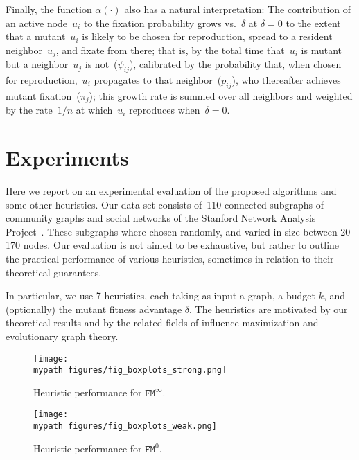 \documentclass[letterpaper]{article}
\def\mypath{}
\newcommand{\NodeActivationMoranStrong}{\texttt{FM}^{\infty}}
\newcommand{\NodeActivationMoranWeak}{\texttt{FM}^{0}}
\newcommand{\FitAdv}{\delta}
\begin{document}
Finally, the function $\alpha(\cdot)$ also has a natural interpretation:
The contribution of an active node~$u_i$ to the fixation probability grows vs.~$\FitAdv$ at $\FitAdv = 0$
to the extent that a mutant~$u_i$ is likely to be chosen for reproduction,
spread to a resident neighbor~$u_j$, and fixate from there;
that is, by the total time that~$u_i$ is mutant but a neighbor~$u_j$ is not~($\psi_{ij}$),
calibrated by the probability that, when chosen for reproduction,~$u_i$ propagates to that neighbor~($p_{ij}$),
who thereafter achieves mutant fixation~($\pi_j$);
this growth rate is summed over all neighbors and weighted by the rate~$1/n$ at which~$u_i$ reproduces when~$\FitAdv=0$.


%
\section{Experiments}\label{sec:experiments}

Here we report on an experimental evaluation of the proposed algorithms and some other heuristics.
Our data set consists of~110 connected subgraphs of community graphs and social networks of the Stanford Network Analysis Project~\cite{Leskovec2014}.
These subgraphs where chosen randomly, and varied in size between 20-170 nodes.
Our evaluation is not aimed to be exhaustive, but rather to outline the practical performance of various heuristics, sometimes in relation to their theoretical guarantees.

In particular, we use 7 heuristics, each taking as input a graph, a budget $k$, and (optionally) the mutant fitness advantage $\FitAdv$.
The heuristics are motivated by our theoretical results and by the related fields of influence maximization and evolutionary graph theory.
%
%
\begin{figure*}[!ht]
\centerline{
\texttt{[image: \\mypath figures/fig\_boxplots\_strong.png]}
}
\caption{Heuristic performance for $\NodeActivationMoranStrong$.}\label{fig:experiments_strong}
\end{figure*}

\begin{figure*}[!ht]
\texttt{[image: \\mypath figures/fig\_boxplots\_weak.png]}
\caption{Heuristic performance for $\NodeActivationMoranWeak$.}\label{fig:experiments_weak}
\end{figure*}
\end{document}
